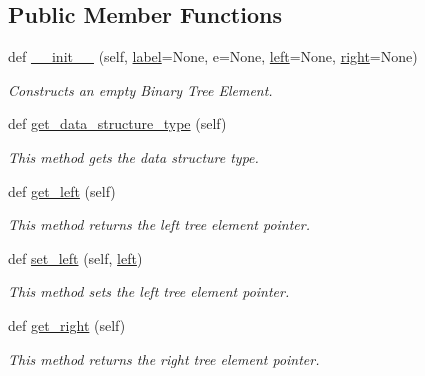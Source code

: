 \subsection*{Public Member Functions}
\begin{DoxyCompactItemize}
\item 
def \mbox{\hyperlink{classbridges_1_1bin__tree__element_1_1_bin_tree_element_aff644a8688e2aabad5086f2484c4eab1}{\+\_\+\+\_\+init\+\_\+\+\_\+}} (self, \mbox{\hyperlink{classbridges_1_1element_1_1_element_a97551dbb005cd5d1f13b65461290c6e3}{label}}=None, e=None, \mbox{\hyperlink{classbridges_1_1bin__tree__element_1_1_bin_tree_element_a1e475410000759a092959455957894b6}{left}}=None, \mbox{\hyperlink{classbridges_1_1bin__tree__element_1_1_bin_tree_element_a6cf0c7fefefd5eada106df191e055ff5}{right}}=None)
\begin{DoxyCompactList}\small\item\em Constructs an empty Binary Tree Element. \end{DoxyCompactList}\item 
def \mbox{\hyperlink{classbridges_1_1bin__tree__element_1_1_bin_tree_element_a974adfbdb569d77586ecf145197b448b}{get\+\_\+data\+\_\+structure\+\_\+type}} (self)
\begin{DoxyCompactList}\small\item\em This method gets the data structure type. \end{DoxyCompactList}\item 
def \mbox{\hyperlink{classbridges_1_1bin__tree__element_1_1_bin_tree_element_abe7b4ac109197c37f911ab3b5acafa7a}{get\+\_\+left}} (self)
\begin{DoxyCompactList}\small\item\em This method returns the left tree element pointer. \end{DoxyCompactList}\item 
def \mbox{\hyperlink{classbridges_1_1bin__tree__element_1_1_bin_tree_element_a51ad9f02aa22cc77dc254b3025cb82a6}{set\+\_\+left}} (self, \mbox{\hyperlink{classbridges_1_1bin__tree__element_1_1_bin_tree_element_a1e475410000759a092959455957894b6}{left}})
\begin{DoxyCompactList}\small\item\em This method sets the left tree element pointer. \end{DoxyCompactList}\item 
def \mbox{\hyperlink{classbridges_1_1bin__tree__element_1_1_bin_tree_element_ad97a28193cf670e61a5be6d221103cec}{get\+\_\+right}} (self)
\begin{DoxyCompactList}\small\item\em This method returns the right tree element pointer. \end{DoxyCompactList}\item 

\end{DoxyCompactItemize}
